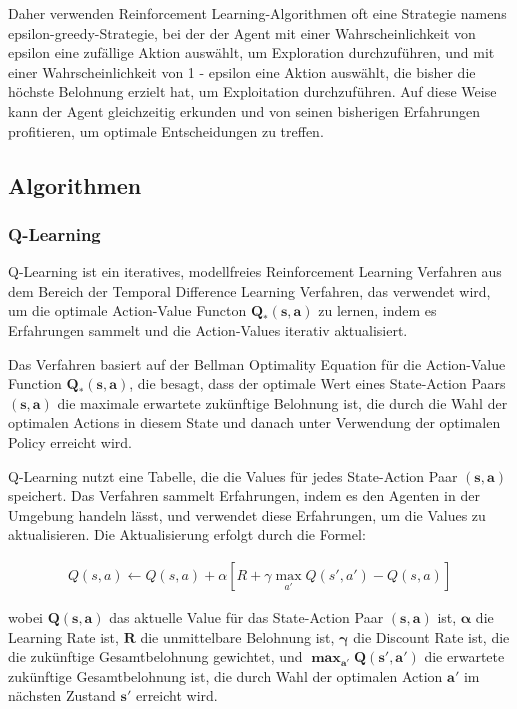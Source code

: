 \begin{enumerate}
    Daher verwenden Reinforcement Learning-Algorithmen oft eine Strategie namens epsilon-greedy-Strategie, bei der der Agent mit einer Wahrscheinlichkeit von epsilon eine zufällige Aktion auswählt, um Exploration durchzuführen, und mit einer Wahrscheinlichkeit von 1 - epsilon eine Aktion auswählt, die bisher die höchste Belohnung erzielt hat, um Exploitation durchzuführen. Auf diese Weise kann der Agent gleichzeitig erkunden und von seinen bisherigen Erfahrungen profitieren, um optimale Entscheidungen zu treffen.

\end{enumerate}

\subsection{Algorithmen}

\subsubsection{Q-Learning}

Q-Learning ist ein iteratives, modellfreies Reinforcement Learning Verfahren aus dem Bereich der Temporal Difference Learning Verfahren, das verwendet wird, um die optimale Action-Value Functon $\bm{Q_{*}(s,a)}$ zu lernen, indem es Erfahrungen sammelt und die Action-Values iterativ aktualisiert.

Das Verfahren basiert auf der Bellman Optimality Equation für die Action-Value Function $\bm{Q_{*}(s,a)}$, die besagt, dass der optimale Wert eines State-Action Paars $\bm{(s,a)}$ die maximale erwartete zukünftige Belohnung ist, die durch die Wahl der optimalen Actions in diesem State und danach unter Verwendung der optimalen Policy erreicht wird.

Q-Learning nutzt eine Tabelle, die die Values für jedes State-Action Paar $\bm{(s,a)}$ speichert. Das Verfahren sammelt Erfahrungen, indem es den Agenten in der Umgebung handeln lässt, und verwendet diese Erfahrungen, um die Values zu aktualisieren. Die Aktualisierung erfolgt durch die Formel:


\begin{align}
    Q(s,a) \leftarrow Q(s,a) + \alpha [R + \gamma \max_{a'} Q(s',a') - Q(s,a)]
\end{align}


wobei $\bm{Q(s,a)}$ das aktuelle Value für das State-Action Paar $\bm{(s,a)}$ ist, $\bm\alpha$ die Learning Rate ist, $\bm{R}$ die unmittelbare Belohnung ist, $\bm\gamma$ die Discount Rate ist, die die zukünftige Gesamtbelohnung gewichtet, und $\bm{\max_{a'} Q(s',a')}$ die erwartete zukünftige Gesamtbelohnung ist, die durch Wahl der optimalen Action $\bm{a'}$ im nächsten Zustand $\bm{s'}$ erreicht wird.

